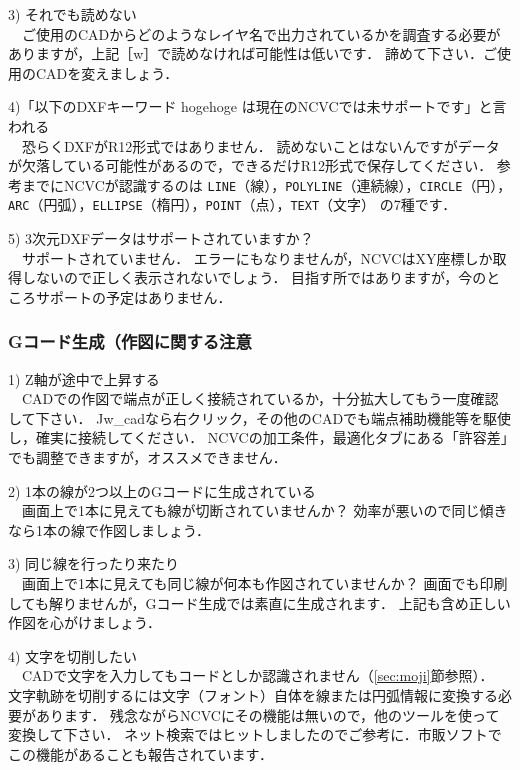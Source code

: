 \vspace*{2zh}
3) それでも読めない\\
　ご使用のCADからどのようなレイヤ名で出力されているかを調査する必要がありますが，上記［\yen{}w］で読めなければ可能性は低いです．
諦めて下さい．ご使用のCADを変えましょう．

\vspace*{1zh}
4)「以下のDXFキーワード hogehoge は現在のNCVCでは未サポートです」と言われる\\
　恐らくDXFがR12形式ではありません．
読めないことはないんですがデータが欠落している可能性があるので，できるだけR12形式で保存してください．
参考までにNCVCが認識するのは
\texttt{LINE}（線），\texttt{POLYLINE}（連続線），\texttt{CIRCLE}（円），\texttt{ARC}（円弧），\texttt{ELLIPSE}（楕円），\texttt{POINT}（点），\texttt{TEXT}（文字）
の7種です．

\vspace*{1zh}
5) 3次元DXFデータはサポートされていますか？\\
　サポートされていません．
エラーにもなりませんが，NCVCはXY座標しか取得しないので正しく表示されないでしょう．
目指す所ではありますが，今のところサポートの予定はありません．

\subsubsection{Gコード生成（作図に関する注意}

1) Z軸が途中で上昇する\\
　CADでの作図で端点が正しく接続されているか，十分拡大してもう一度確認して下さい．
Jw\_cadなら右クリック，その他のCADでも端点補助機能等を駆使し，確実に接続してください．
NCVCの加工条件，最適化タブにある「許容差」でも調整できますが，オススメできません．

\vspace*{1zh}
2) 1本の線が2つ以上のGコードに生成されている\\
　画面上で1本に見えても線が切断されていませんか？
効率が悪いので同じ傾きなら1本の線で作図しましょう．

\vspace*{1zh}
3) 同じ線を行ったり来たり\\
　画面上で1本に見えても同じ線が何本も作図されていませんか？
画面でも印刷しても解りませんが，Gコード生成では素直に生成されます．
上記も含め正しい作図を心がけましょう．

\vspace*{1zh}
4) 文字を切削したい\\
　CADで文字を入力してもコードとしか認識されません（\ref{sec:moji}節参照）．
文字軌跡を切削するには文字（フォント）自体を線または円弧情報に変換する必要があります．
残念ながらNCVCにその機能は無いので，他のツールを使って変換して下さい．
ネット検索ではヒットしましたのでご参考に．市販ソフトでこの機能があることも報告されています．

